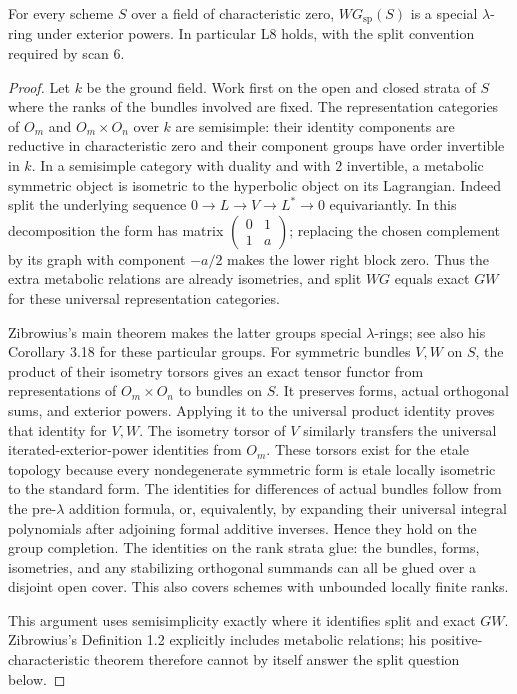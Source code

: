 \begin{proposition}
\label{C:charzero_lambda}
For every scheme $S$ over a field of characteristic zero,
$WG_{\mathrm{sp}}(S)$ is a special $\lambda$-ring under exterior powers.
In particular L8 holds, with the split convention required by scan 6.
\end{proposition}
\begin{proof}
Let $k$ be the ground field. Work first on the open and closed strata of
$S$ where the ranks of the bundles involved are fixed. The representation categories of $O_m$ and
$O_m\times O_n$ over $k$ are semisimple: their identity components are
reductive in characteristic zero and their component groups have order
invertible in $k$. In a semisimple category with duality and with $2$
invertible, a metabolic symmetric object is isometric to the hyperbolic
object on its Lagrangian. Indeed split the underlying sequence
$0\to L\to V\to L^*\to0$ equivariantly. In this decomposition the form has
matrix $\left(\begin{smallmatrix}0&1\\1&a\end{smallmatrix}\right)$; replacing
the chosen complement by its graph with component $-a/2$ makes the lower
right block zero. Thus the extra metabolic relations are already isometries,
and split $WG$ equals exact $GW$ for these universal representation categories.

Zibrowius's main theorem \cite{C-Zibrowius2015} makes the latter groups
special $\lambda$-rings; see also his Corollary 3.18 for these particular
groups. For symmetric bundles $V,W$ on $S$, the product of their isometry
torsors gives an exact tensor functor from representations of
$O_m\times O_n$ to bundles on $S$. It preserves forms, actual orthogonal
sums, and exterior powers. Applying it to the universal product identity
proves that identity for $V,W$. The isometry torsor of $V$ similarly transfers
the universal iterated-exterior-power identities from $O_m$. These torsors
exist for the etale topology because every nondegenerate symmetric form is
etale locally isometric to the standard form. The identities for differences
of actual bundles follow from the pre-$\lambda$ addition formula, or,
equivalently, by expanding their universal integral polynomials after adjoining
formal additive inverses. Hence they hold on the group completion.
The identities on the rank strata glue: the bundles, forms, isometries,
and any stabilizing orthogonal summands can all be glued over a disjoint
open cover. This also covers schemes with unbounded locally finite ranks.

This argument uses semisimplicity exactly where it identifies split and exact
$GW$. Zibrowius's Definition 1.2 explicitly includes metabolic relations;
his positive-characteristic theorem therefore cannot by itself answer the
split question below.
\end{proof}

